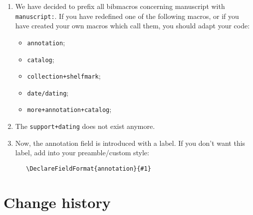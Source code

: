 \documentclass{ltxdockit}[2011/03/25]
\begin{document}
\begin{enumerate}
  \item We have decided to prefix all bibmacros concerning manuscript with \verb+manuscript:+.
    If you have redefined one of the following macros, or if you have created your own macros which call them, you should adapt your code:
    \begin{itemize}
      \item \verb+annotation+;
      \item \verb+catalog+;
      \item \verb|collection+shelfmark|;
      \item \verb+date/dating+;
      \item \verb|more+annotation+catalog|;
    \end{itemize}
  \item The \verb|support+dating| does not exist anymore.
  \item Now, the annotation field is introduced with a label.
 If you don't want this label, add into your preamble/custom style:
 \begin{verbatim}
   \DeclareFieldFormat{annotation}{#1}
 \end{verbatim}
\end{enumerate}
\section{Change history}
\end{document}
